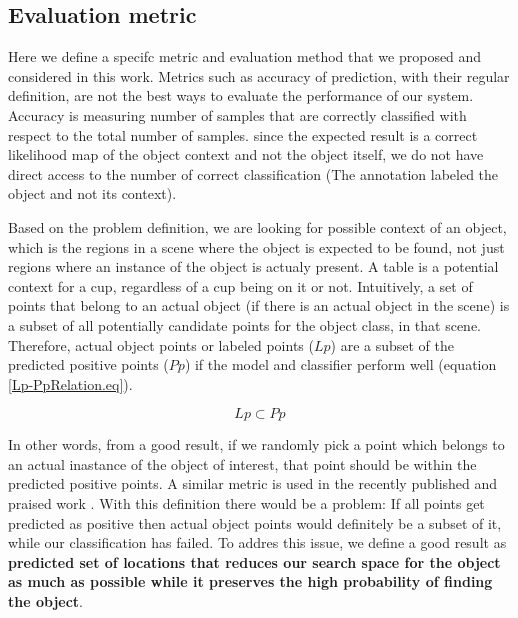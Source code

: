 \subsection{Evaluation metric}
\label{EvaluationMetric.ssec}


Here we define a specifc metric and evaluation method that we proposed and considered in this work.
Metrics such as accuracy of prediction, with their regular definition, are not the best ways to evaluate the performance of our system.
Accuracy is measuring number of samples that are correctly classified with respect to the total number of samples.
since the expected result is a correct likelihood map of the object context and not the object itself, we do not have direct access to the number of correct classification (The annotation labeled the object and not its context). 

Based on the problem definition, we are looking for possible context of an object, which is the regions in a scene where the 
object is expected to be found, not just regions where an instance of the object is actualy present. A table is a potential context for a cup, regardless of a cup being on it or not.   
Intuitively, a set of points that belong to an actual object (if there is an actual object in the scene) is a subset of all 
potentially candidate points for the object class, in that scene.
Therefore, actual object points or labeled points ($Lp$) are a subset of the predicted positive points ($Pp$) if the model and classifier perform 
well (equation \ref{Lp-PpRelation.eq}).

\begin{equation}
 \label{Lp-PpRelation.eq}
 Lp \subset Pp
\end{equation}

In other words, from a good result, if we randomly pick a point which belongs to an actual inastance of the object of interest, that point should be within the predicted positive points. A similar metric is used in the recently published and praised work \cite{aydemir2012_3Dcontext}.
With this definition there would be a problem: If all points get predicted as positive then actual object points would 
definitely be a subset of it, while our classification has failed.
To addres this issue, we define a good result as \textbf {predicted set of locations that reduces our search space for the object as much as 
possible while it preserves the high probability of finding the object}.

